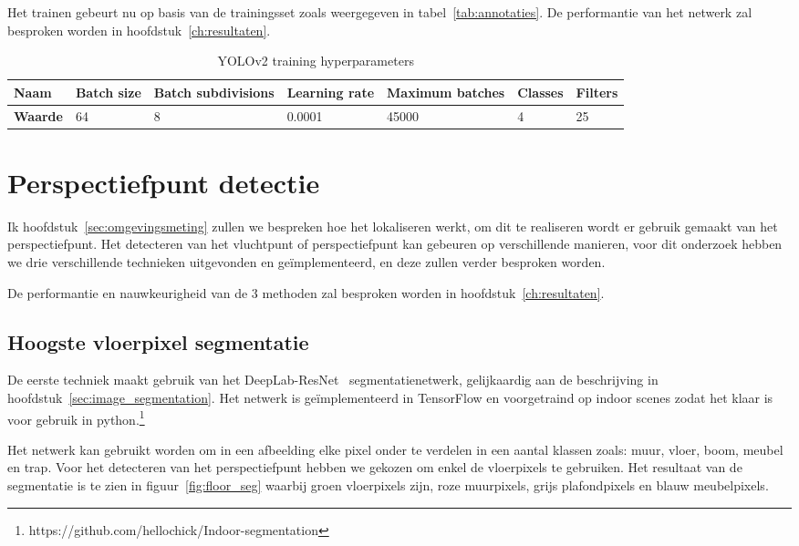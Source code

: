 Het trainen gebeurt nu op basis van de trainingsset zoals weergegeven in tabel~\ref{tab:annotaties}. De performantie van het netwerk zal besproken worden in hoofdstuk~\ref{ch:resultaten}.

\begin{table}[h]
    \centering
    \caption{YOLOv2 training hyperparameters} \label{tab:hyperparameters}
    \begin{tabular}{l | l | l | l | l | l | l}
        \textbf{Naam} & Batch size & Batch subdivisions & Learning rate & Maximum batches & Classes & Filters \\
        \hline
        \textbf{Waarde} & 64 & 8 & 0.0001 & 45000 & 4 & 25
    \end{tabular}
\end{table}


\section{Perspectiefpunt detectie}\label{sec:perspectiefpunt_detectie}

Ik hoofdstuk~\ref{sec:omgevingsmeting} zullen we bespreken hoe het lokaliseren werkt, om dit te realiseren wordt er gebruik gemaakt van het perspectiefpunt.
Het detecteren van het vluchtpunt of perspectiefpunt kan gebeuren op verschillende manieren, voor dit onderzoek hebben we drie verschillende technieken uitgevonden en ge\"{i}mplementeerd, en deze zullen verder besproken worden.

De performantie en nauwkeurigheid van de 3 methoden zal besproken worden in hoofdstuk~\ref{ch:resultaten}.

\subsection{Hoogste vloerpixel segmentatie}\label{sec:seg_highest}

De eerste techniek maakt gebruik van het DeepLab-ResNet~\cite{resnet101} segmentatienetwerk, gelijkaardig aan de beschrijving in hoofdstuk~\ref{sec:image_segmentation}.
Het netwerk is ge\"{i}mplementeerd in TensorFlow en voorgetraind op indoor scenes zodat het klaar is voor gebruik in python.\footnote{https://github.com/hellochick/Indoor-segmentation}

Het netwerk kan gebruikt worden om in een afbeelding elke pixel onder te verdelen in een aantal klassen zoals: muur, vloer, boom, meubel en trap.
Voor het detecteren van het perspectiefpunt hebben we gekozen om enkel de vloerpixels te gebruiken.
Het resultaat van de segmentatie is te zien in figuur~\ref{fig:floor_seg} waarbij groen vloerpixels zijn, roze muurpixels, grijs plafondpixels en blauw meubelpixels.

